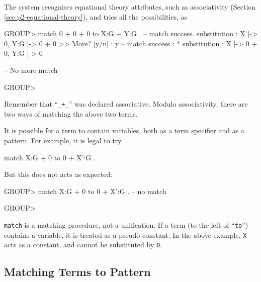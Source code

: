 \documentclass[a4paper]{memoir}
\begin{document}
The system recognises equational theory
attributes, such as associativity (Section \ref{sec:p2-equational-theory}),
and tries all the possibilities, as
\begin{vvtm}
\begin{ccode}
  GROUP> match 0 + 0 + 0 to X:G + Y:G .
  -- match success.
   substitution : { X |-> 0, Y:G |-> 0 + 0 }
  >> More? [y/n] : y
  -- match success : 
   * substitution : { X |-> 0 + 0, Y:G |-> 0 }

  -- No more match

  GROUP> 
\end{ccode}
\end{vvtm}
Remember that ``\verb|_+_|'' was declared associative. Modulo associativity,
there are two ways of matching the above two terms.

\begin{warning}
  It is possible for a term to contain variables, both as a term specifier
  and as a pattern. For example, it is legal to try
  \begin{vvtm}
\begin{ccode}
    match X:G + 0 to 0 + X':G .
  \end{ccode}
\end{vvtm}
  But this does not acts as expected:
  \begin{vvtm}
\begin{ccode}
    GROUP> match X:G + 0 to 0 + X':G .
    -- no match

    GROUP> 
  \end{ccode}
\end{vvtm}
  \verb|match| is a matching procedure,
  not a unification. If a term (to the left of ``\verb|to|'') contains
  a variable, it is treated as a pseudo-constant. In the above example,
  \verb|X| acts as a constant, and cannot be substituted by \verb|0|.
\end{warning}

\subsection{Matching Terms to Pattern}\label{sec:p2-match-to-pattern}
\end{document}
